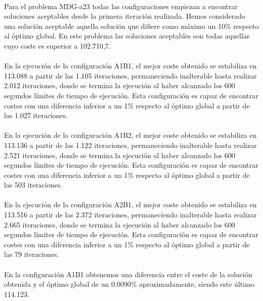 	\paragraph{}Para el problema MDG-a23 todas las configuraciones empiezan a encontrar soluciones aceptables desde la primera iteración realizada. Hemos considerado una solución aceptable aquella solución que difiere como máximo un 10\% respecto al óptimo global. En este problema las soluciones aceptables son todas aquellas cuyo coste es superior a 102.710,7.
	
	\paragraph{}En la ejecución de la configuración A1B1, el mejor coste obtenido se estabiliza en 113.088 a partir de las 1.105 iteraciones, permaneciendo inalterable hasta realizar 2.012 iteraciones, donde se termina la ejecución al haber alcanzado los 600 segundos límites de tiempo de ejecución. Esta configuración es capaz de encontrar costes con una diferencia inferior a un 1\% respecto al óptimo global a partir de las 1.027 iteraciones.
	
	\paragraph{}En la ejecución de la configuración A1B2, el mejor coste obtenido se estabiliza en 113.136 a partir de las 1.122 iteraciones, permaneciendo inalterable hasta realizar 2.521 iteraciones, donde se termina la ejecución al haber alcanzado los 600 segundos límites de tiempo de ejecución. Esta configuración es capaz de encontrar costes con una diferencia inferior a un 1\% respecto al óptimo global a partir de las 503 iteraciones.
	
	\paragraph{}En la ejecución de la configuración A2B1, el mejor coste obtenido se estabiliza en 113.516 a partir de las 2.372 iteraciones, permaneciendo inalterable hasta realizar 2.665 iteraciones, donde se termina la ejecución al haber alcanzado los 600 segundos límites de tiempo de ejecución. Esta configuración es capaz de encontrar costes con una diferencia inferior a un 1\% respecto al óptimo global a partir de las 79 iteraciones.
	
	\paragraph{}En la configuración A1B1 obtenemos una diferencia entre el coste de la solución obtenida y el óptimo global de un 0.0090\% aproximadamente, siendo este último 114.123.
	

